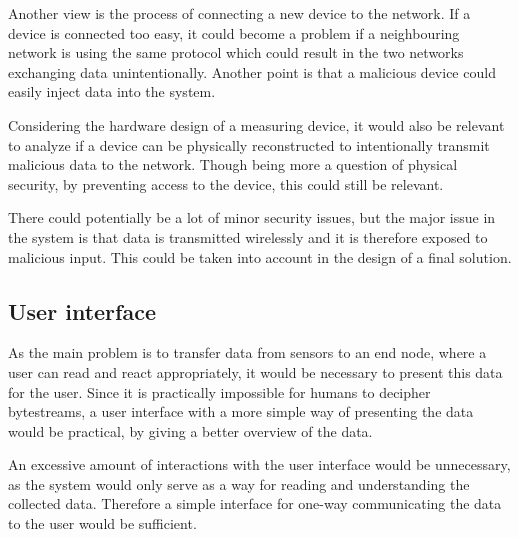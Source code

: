 Another view is the process of connecting a new device to the network. If a device is connected too easy, it could become a problem if a neighbouring network is using the same protocol which could result in the two networks exchanging data unintentionally. Another point is that a malicious device could easily inject data into the system.

Considering the hardware design of a measuring device, it would also be relevant to analyze if a device can be physically reconstructed to intentionally transmit malicious data to the network. Though being more a question of physical security, by preventing access to the device, this could still be relevant.

There could potentially be a lot of minor security issues, but the major issue in the system is that data is transmitted wirelessly and it is therefore exposed to malicious input. This could be taken into account in the design of a final solution.

\subsection{User interface}
As the main problem is to transfer data from sensors to an end node, where a user can read and react appropriately, it would be necessary to present this data for the user. Since it is practically impossible for humans to decipher bytestreams, a user interface with a more simple way of presenting the data would be practical, by giving a better overview of the data.

An excessive amount of interactions with the user interface would be unnecessary, as the system would only serve as a way for reading and understanding the collected data. Therefore a simple interface for one-way communicating the data to the user would be sufficient.
